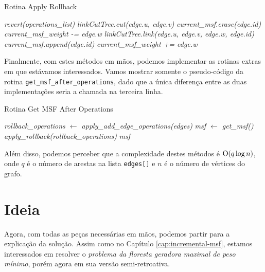 \begin{algorithm}[h!]
    \caption{Rotina Apply Rollback}\label{imsf-apply-rollback}
    \begin{algorithmic}[1]
        \State \emph{revert(operations\_list)}
        \State \emph{linkCutTree.cut(edge.u, edge.v)}
        \State \emph{current\_msf.erase(edge.id)}
        \State \emph{current\_msf\_weight -= edge.w}
        \Else
        \State \emph{linkCutTree.link(edge.u, edge.v, edge.w, edge.id)}
        \State \emph{current\_msf.append(edge.id)}
        \State \emph{current\_msf\_weight += edge.w}
        \EndIf
        \EndFor
        \EndFunction
    \end{algorithmic}
\end{algorithm}

Finalmente, com estes métodos em mãos, podemos implementar as rotinas extras em que estávamos interessados. Vamos mostrar somente o pseudo-código da rotina \texttt{get\_msf\_after\_operations}, dado que a única diferença entre as duas implementações seria a chamada na terceira linha.

\begin{algorithm}[h!]
    \caption{Rotina Get MSF After Operations}\label{imsf-msf-after}
    \begin{algorithmic}[1]
        \State \emph{rollback\_operations $\gets$ apply\_add\_edge\_operations(edges)}
        \State \emph{msf $\gets$ get\_msf()}
        \State \emph{apply\_rollback(rollback\_operations)}
        \State \Return \emph{msf}
        \EndFunction
    \end{algorithmic}
\end{algorithm}

Além disso, podemos perceber que a complexidade destes métodos é $\mathrm{O}(q \log n)$, onde $q$ é o número de arestas na lista \texttt{edges[]} e $n$ é o número de vértices do grafo.

\section{Ideia}
\label{sec:rmsf-ideia}

Agora, com todas as peças necessárias em mãos, podemos partir para a explicação da solução. Assim como no Capítulo \ref{cap:incremental-msf}, estamos interessados em resolver o \emph{problema da floresta geradora maximal de peso mínimo}, porém agora em sua versão semi-retroativa.


